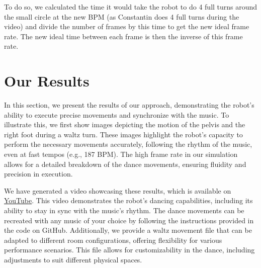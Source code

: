 \documentclass{amsart}
\theoremstyle{definition}
\theoremstyle{plain}
\begin{document}
To do so, we calculated the time it would take the robot to do 4 full turns around the small circle at the new BPM (as Constantin does 4 full turns during the video) 
and divide the number of frames by this time to get the new ideal frame rate. 
The new ideal time between each frame is then the inverse of this frame rate.

\section{Our Results}

In this section, we present the results of our approach, demonstrating the robot's ability to execute precise movements and synchronize with the music. 
To illustrate this, we first show images depicting the motion of the pelvis and the right foot during a waltz turn. These images highlight the robot's capacity to perform the necessary movements accurately, 
following the rhythm of the music, even at fast tempos (e.g., 187 BPM). 
The high frame rate in our simulation allows for a detailed breakdown of the dance movements, ensuring fluidity and precision in execution.

We have generated a video showcasing these results, which is available on \href{https://www.youtube.com/watch?v=1MIFP3BURI0}{YouTube}. 
This video demonstrates the robot’s dancing capabilities, including its ability to stay in sync with the music’s rhythm. 
The dance movements can be recreated with any music of your choice by following the instructions provided in the code on GitHub. 
Additionally, we provide a waltz movement file that can be adapted to different room configurations, offering flexibility for various performance scenarios. 
This file allows for customizability in the dance, including adjustments to suit different physical spaces.
\end{document}
